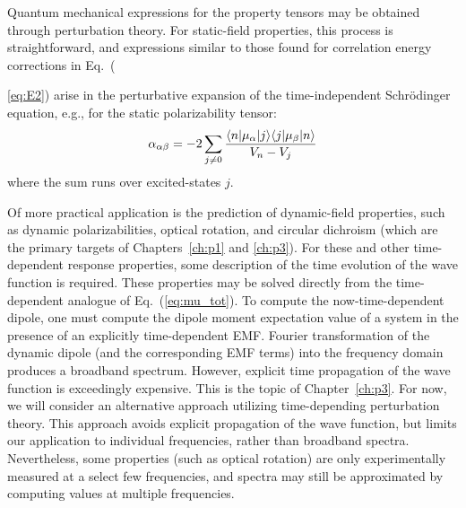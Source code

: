 Quantum mechanical expressions for the property tensors may be obtained through perturbation theory. 
For static-field properties, this process is straightforward, and expressions similar to those found for
correlation energy corrections in Eq.~({\ref{eq:E2}) arise in the perturbative expansion of the time-independent Schr\"odinger
equation, e.g., for the static polarizability tensor:
\begin{equation} \label{eq:static_pol}
\alpha_{\alpha\beta} = -2\sum_{j\neq 0}\frac{\langle n |\mu_\alpha| j \rangle\langle j |\mu_\beta| n \rangle}{V_n - V_j} 
\end{equation}
where the sum runs over excited-states $j$.

Of more practical application is the prediction of dynamic-field properties, such as dynamic polarizabilities, 
optical rotation, and circular dichroism (which are the primary targets of Chapters~\ref{ch:p1}
and \ref{ch:p3}).
For these and other time-dependent response properties, some description of the time evolution of the wave function is
required. 
These properties may be solved directly from the time-dependent analogue of Eq.~(\ref{eq:mu_tot}). 
To compute the now-time-dependent dipole, one must compute the dipole moment expectation value of a system 
in the presence of an explicitly time-dependent EMF.
Fourier transformation of the dynamic dipole (and the corresponding EMF terms) 
into the frequency domain produces a broadband spectrum.
However, explicit time propagation of the wave function is exceedingly expensive.\cite{Goings2018} 
This is the topic of Chapter~\ref{ch:p3}. 
For now, we will consider an alternative approach utilizing time-depending perturbation 
theory. This approach avoids explicit propagation of the wave function, but limits our
application to individual frequencies, rather than broadband spectra. Nevertheless, 
some properties (such as optical rotation) are only experimentally measured at a select few
frequencies, and spectra may still be approximated by computing values at 
multiple frequencies. 

}

